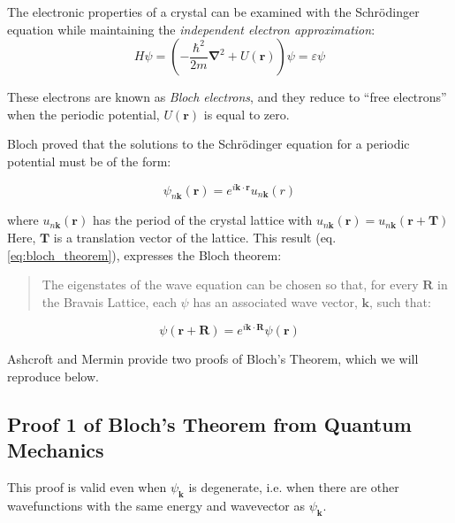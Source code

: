 The electronic properties of a crystal can be examined with the Schrödinger equation while maintaining the \textit{independent electron approximation}:
\begin{equation} \label{eq:schrod}
	H\psi=\left(-\frac{\hbar^2}{2m}\boldsymbol{\nabla}^2 + U(\boldsymbol{r})\right)\psi = \varepsilon\psi
\end{equation}

These electrons are known as \textit{Bloch electrons}, and they reduce to ``free electrons'' when the periodic potential, $U(\boldsymbol{r})$ is equal to zero.

Bloch proved that the solutions to the Schrödinger equation for a periodic potential must be of the form:

\begin{equation} \label{eq:bloch_theorem}
	\psi_{n\boldsymbol{k}}(\boldsymbol{r}) 
	= e^{i\boldsymbol{k} \cdot \boldsymbol{r}}
	u_{n\boldsymbol{k}}(r)
\end{equation}

where $u_{n\boldsymbol{k}}(\boldsymbol{r})$ has the period of the crystal lattice with $u_{n\boldsymbol{k}}(\boldsymbol{r}) = u_{n\boldsymbol{k}}(\boldsymbol{r} + \boldsymbol{T})$ 
Here, $\boldsymbol{T}$ is a translation vector of the lattice. This result (eq. \ref{eq:bloch_theorem}), expresses the Bloch theorem:
\begin{quotation}
	The eigenstates of the wave equation can be chosen so that, for every $\boldsymbol{R}$ in the Bravais Lattice, each $\psi$ has an associated wave vector, $\boldsymbol{k}$, such that:
\end{quotation}

\begin{equation} \label{eq:bloch_theorem_restate}
	\psi(\boldsymbol{r} + \boldsymbol{R})
	= e^{i\boldsymbol{k} \cdot \boldsymbol{R}}
	\psi(\boldsymbol{r})
\end{equation}


Ashcroft and Mermin provide two proofs of Bloch's Theorem, which we will reproduce below.

\subsection{Proof 1 of Bloch's Theorem from Quantum Mechanics}
This proof is valid even when $\psi_{\boldsymbol{k}}$ is degenerate, i.e. when there are other wavefunctions with the same energy and wavevector as $\psi_{\boldsymbol{k}}$.

